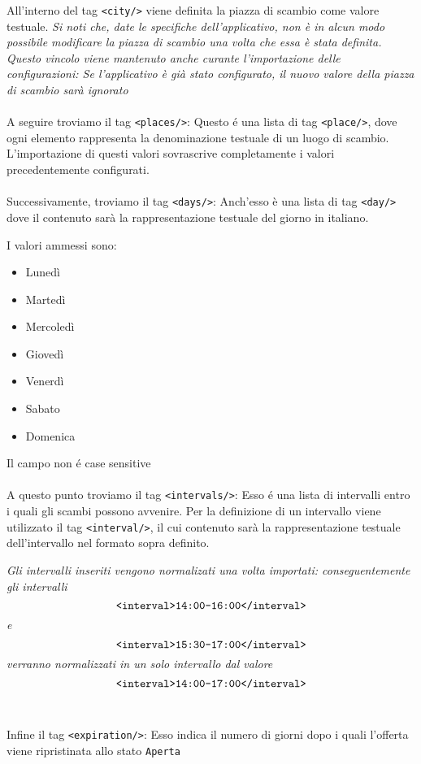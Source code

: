 All'interno del tag \verb|<city/>| viene definita la piazza di scambio come valore testuale.
\textit{Si noti che, date le specifiche dell'applicativo, non è in alcun modo possibile modificare la piazza di scambio una volta che essa è stata definita.}
\textit{Questo vincolo viene mantenuto anche curante l'importazione delle configurazioni: Se l'applicativo è già stato configurato, il nuovo valore della piazza di scambio sarà ignorato}
\\\\
A seguire troviamo il tag \verb|<places/>|: Questo é una lista di tag \verb|<place/>|, dove ogni elemento rappresenta la denominazione testuale di un luogo di scambio.
L'importazione di questi valori sovrascrive completamente i valori precedentemente configurati.
\\\\
Successivamente, troviamo il tag \verb|<days/>|: Anch'esso è una lista di tag \verb|<day/>| dove il contenuto sarà la rappresentazione testuale del giorno in italiano.

I valori ammessi sono:
\begin{itemize}
    \item Lunedì
    \item Martedì
    \item Mercoledì
    \item Giovedì
    \item Venerdì
    \item Sabato
    \item Domenica
\end{itemize}
Il campo non é case sensitive
\\\\
A questo punto troviamo il tag \verb|<intervals/>|: Esso é una lista di intervalli entro i quali gli scambi possono avvenire. Per la definizione di un intervallo viene utilizzato il tag \verb|<interval/>|, il cui contenuto sarà la rappresentazione testuale dell'intervallo nel formato sopra definito.

\textit{Gli intervalli inseriti vengono normalizati una volta importati: conseguentemente gli intervalli} \[\verb|<interval>14:00-16:00</interval>|\] \textit{e} \[\verb|<interval>15:30-17:00</interval>|\] \textit{verranno normalizzati in un solo intervallo dal valore} \[\verb|<interval>14:00-17:00</interval>|\]
\\\\
Infine il tag \verb|<expiration/>|: Esso indica il numero di giorni dopo i quali l'offerta viene ripristinata allo stato \texttt{Aperta}

